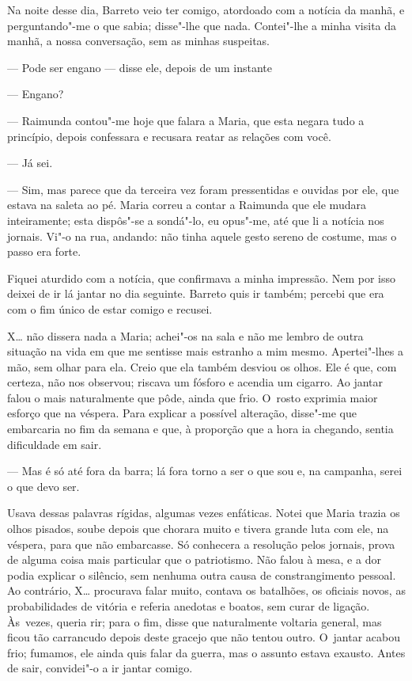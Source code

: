\begin{linenumbers}
Na noite desse dia, Barreto veio ter comigo, atordoado com a notícia da
manhã, e perguntando"-me o que sabia; disse"-lhe que nada. Contei"-lhe a
minha visita da manhã, a nossa conversação, sem as minhas suspeitas.

--- Pode ser engano --- disse ele, depois de um instante

--- Engano?

--- Raimunda contou"-me hoje que falara a Maria, que esta negara tudo a
princípio, depois confessara e recusara reatar as relações com você.

--- Já sei.

--- Sim, mas parece que da terceira vez foram pressentidas e ouvidas por
ele, que estava na saleta ao pé. Maria correu a contar a Raimunda que
ele mudara inteiramente; esta dispôs"-se a sondá"-lo, eu opus"-me, até que
li a notícia nos jornais. Vi"-o na rua, andando: não tinha aquele gesto
sereno de costume, mas o passo era forte.

Fiquei aturdido com a notícia, que confirmava a minha impressão. Nem por
isso deixei de ir lá jantar no dia seguinte. Barreto quis ir também;
percebi que era com o fim único de estar comigo e recusei.

X\ldots{} não dissera nada a Maria; achei"-os na sala e não me lembro de outra
situação na vida em que me sentisse mais estranho a mim mesmo.
Apertei"-lhes a mão, sem olhar para ela. Creio que ela também desviou os
olhos. Ele é que, com certeza, não nos observou; riscava um fósforo e
acendia um cigarro. Ao jantar falou o mais naturalmente que pôde, ainda
que frio. O~rosto exprimia maior esforço que na véspera. Para explicar a
possível alteração, disse"-me que embarcaria no fim da semana e que, à
proporção que a hora ia chegando, sentia dificuldade em sair.

--- Mas é só até fora da barra; lá fora torno a ser o que sou e, na
campanha, serei o que devo ser.

Usava dessas palavras rígidas, algumas vezes enfáticas. Notei que Maria
trazia os olhos pisados, soube depois que chorara muito e tivera grande
luta com ele, na véspera, para que não embarcasse. Só conhecera a
resolução pelos jornais, prova de alguma coisa mais particular que o
patriotismo. Não falou à mesa, e a dor podia explicar o silêncio, sem
nenhuma outra causa de constrangimento pessoal. Ao contrário, X\ldots{}
procurava falar muito, contava os batalhões, os oficiais novos, as
probabilidades de vitória e referia anedotas e boatos, sem curar de
ligação. Às~vezes, queria rir; para o fim, disse que naturalmente
voltaria general, mas ficou tão carrancudo depois deste gracejo que não
tentou outro. O~jantar acabou frio; fumamos, ele ainda quis falar da
guerra, mas o assunto estava exausto. Antes de sair, convidei"-o a ir
jantar comigo.


\end{linenumbers}
